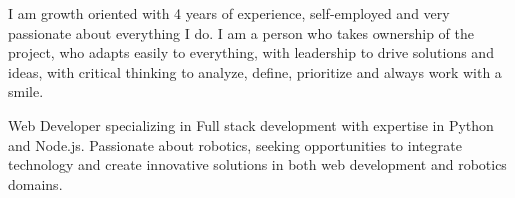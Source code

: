 % 

I am growth oriented with 4 years of experience, self-employed and very passionate about everything I do. I am a person who takes ownership of the project, who adapts easily to everything, with leadership to drive solutions and ideas, with critical thinking to analyze, define, prioritize and always work with a smile.




Web Developer specializing in Full stack development with expertise in Python and Node.js. Passionate about robotics, seeking opportunities to integrate technology and create innovative solutions in both web development and robotics domains.

